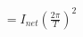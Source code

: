 \documentclass[preview]{standalone}
\begin{document}
\begin{align*}
= I_{net} (\frac{2\pi}{T})^2
\end{align*}
\end{document}
